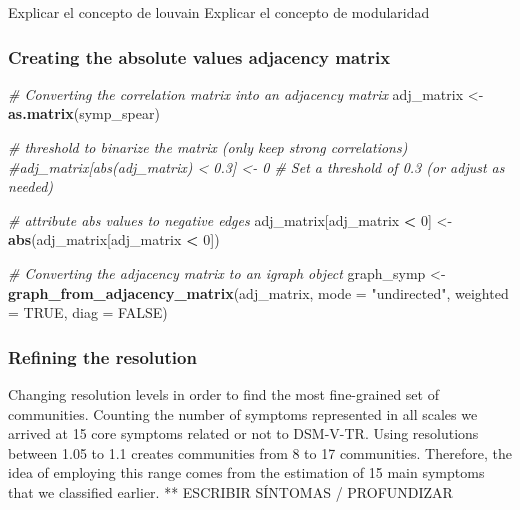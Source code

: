 \documentclass[
]{article}
\newenvironment{Shaded}{\begin{snugshade}}{\end{snugshade}}
\newcommand{\AttributeTok}[1]{\textcolor[rgb]{0.13,0.29,0.53}{#1}}
\newcommand{\CommentTok}[1]{\textcolor[rgb]{0.56,0.35,0.01}{\textit{#1}}}
\newcommand{\ConstantTok}[1]{\textcolor[rgb]{0.56,0.35,0.01}{#1}}
\newcommand{\DecValTok}[1]{\textcolor[rgb]{0.00,0.00,0.81}{#1}}
\newcommand{\FunctionTok}[1]{\textcolor[rgb]{0.13,0.29,0.53}{\textbf{#1}}}
\newcommand{\NormalTok}[1]{#1}
\newcommand{\OtherTok}[1]{\textcolor[rgb]{0.56,0.35,0.01}{#1}}
\newcommand{\SpecialCharTok}[1]{\textcolor[rgb]{0.81,0.36,0.00}{\textbf{#1}}}
\newcommand{\StringTok}[1]{\textcolor[rgb]{0.31,0.60,0.02}{#1}}
\begin{document}
Explicar el concepto de louvain Explicar el concepto de modularidad

\subsubsection{Creating the absolute values adjacency
matrix}\label{creating-the-absolute-values-adjacency-matrix}

\begin{Shaded}
\begin{Highlighting}[]
\CommentTok{\# Converting the correlation matrix into an adjacency matrix}
\NormalTok{adj\_matrix }\OtherTok{\textless{}{-}} \FunctionTok{as.matrix}\NormalTok{(symp\_spear)}

\CommentTok{\# threshold to binarize the matrix (only keep strong correlations)}
\CommentTok{\#adj\_matrix[abs(adj\_matrix) \textless{} 0.3] \textless{}{-} 0  \# Set a threshold of 0.3 (or adjust as needed)}

\CommentTok{\# attribute abs values to negative edges}
\NormalTok{adj\_matrix[adj\_matrix }\SpecialCharTok{\textless{}} \DecValTok{0}\NormalTok{] }\OtherTok{\textless{}{-}} \FunctionTok{abs}\NormalTok{(adj\_matrix[adj\_matrix }\SpecialCharTok{\textless{}} \DecValTok{0}\NormalTok{])}

\CommentTok{\# Converting the adjacency matrix to an igraph object}
\NormalTok{graph\_symp }\OtherTok{\textless{}{-}} \FunctionTok{graph\_from\_adjacency\_matrix}\NormalTok{(adj\_matrix, }\AttributeTok{mode =} \StringTok{"undirected"}\NormalTok{, }\AttributeTok{weighted =} \ConstantTok{TRUE}\NormalTok{, }\AttributeTok{diag =} \ConstantTok{FALSE}\NormalTok{)}
\end{Highlighting}
\end{Shaded}

\subsubsection{Refining the resolution}\label{refining-the-resolution}

Changing resolution levels in order to find the most fine-grained set of
communities. Counting the number of symptoms represented in all scales
we arrived at 15 core symptoms related or not to DSM-V-TR. Using
resolutions between 1.05 to 1.1 creates communities from 8 to 17
communities. Therefore, the idea of employing this range comes from the
estimation of 15 main symptoms that we classified earlier. ** ESCRIBIR
SÍNTOMAS / PROFUNDIZAR
\end{document}
